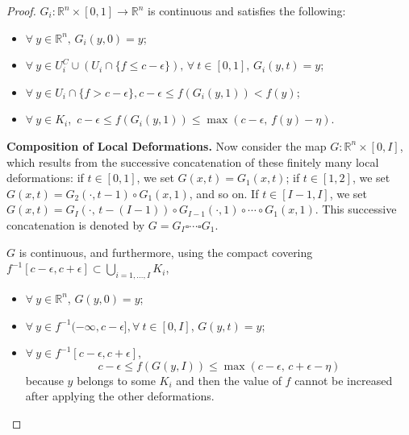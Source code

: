 \documentclass[11pt]{article}
\newcommand{\R}{\mathbb{R}}
\newcommand{\eps}{\epsilon}
\newcommand{\inter}{\cap}
\newcommand{\union}{\cup}
\theoremstyle{plain}
\theoremstyle{definition}
\theoremstyle{remark}
\begin{document}
\begin{proof}
		$G_i : \R^n \times [0,1] \to \R^n$ is continuous and satisfies the following:
		\begin{itemize}
			\item $\forall\ y \in \R^n,\, G_i(y,0) = y$;
			\item $\forall\ y \in U_i^C \union (U_i \inter \{f \leq c - \eps\}),\, \forall\ t \in [0,1],\, G_i(y,t) = y$;
			\item $\forall\ y \in U_i \inter \{f > c - \eps\}, c -\eps \leq f( G_i(y,1) ) < f(y)$;
			\item $\forall\ y \in K_i$,\,  
			$ c-\eps \leq f(G_i(y,1)) \leq \max(c - \eps,\, f(y) - \eta)$.
		\end{itemize}
		
		\textbf{Composition of Local Deformations.}
		Now consider the map $G : \R^n \times [0,I] $, which 
		results from the successive concatenation of these finitely many local deformations: if $t \in [0,1]$, we set $G(x,t) = G_1(x,t)$; if $t \in [1,2]$, we set $G(x,t) = G_2(\cdot, t - 1) \circ G_1(x,1)$, and so on.  If $t \in [I-1, I]$, we set $G(x,t) = G_{I}(\cdot,\, t - (I-1)) \circ G_{I-1}(\cdot, 1) \circ \cdots \circ G_1(x, 1)$. 
		This successive concatenation is denoted by $G = G_{I} \square \cdots \square G_1$.
		
		$G$ is continuous, and furthermore, using the compact covering $f^{-1}[c-\eps, c+\eps] \subset \bigcup\limits_{i = 1, \ldots, I} K_i$,
		\begin{itemize}
			\item $\forall\ y \in \R^n$, $G(y, 0) = y$;
			\item $\forall\ y \in f^{-1}(-\infty, c-\eps], \forall\ t \in [0, I]$, $G(y, t) = y$;
			\item $\forall\ y \in f^{-1}[c-\eps, c+\eps]$, 
			\[c - \eps \leq f(G(y,I)) \leq \max(c-\eps,\, c + \eps - \eta)\] because $y$ belongs to some $K_i$ and then the value of $f$ cannot be increased after applying the other deformations.
		\end{itemize}
		

\end{proof}
\end{document}
